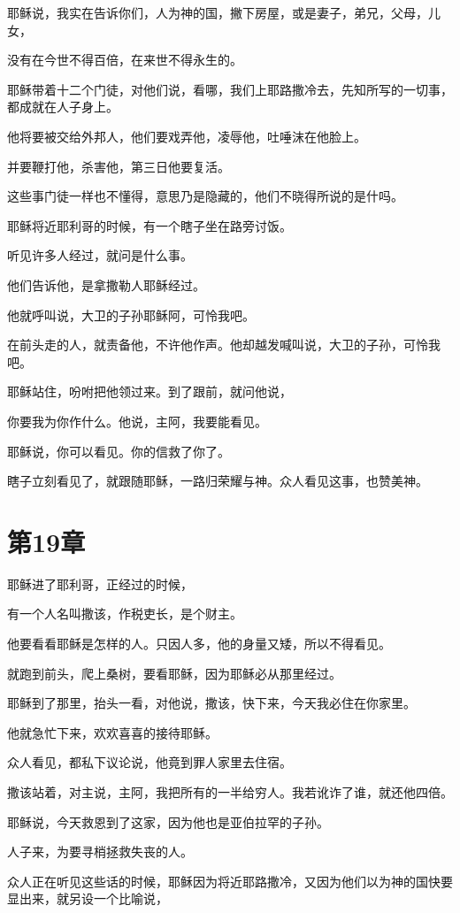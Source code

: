 \documentclass[12pt,oneside]{book}
\begin{document}
耶稣说，我实在告诉你们，人为神的国，撇下房屋，或是妻子，弟兄，父母，儿女，

没有在今世不得百倍，在来世不得永生的。

耶稣带着十二个门徒，对他们说，看哪，我们上耶路撒冷去，先知所写的一切事，都成就在人子身上。

他将要被交给外邦人，他们要戏弄他，凌辱他，吐唾沫在他脸上。

并要鞭打他，杀害他，第三日他要复活。

这些事门徒一样也不懂得，意思乃是隐藏的，他们不晓得所说的是什吗。

耶稣将近耶利哥的时候，有一个瞎子坐在路旁讨饭。

听见许多人经过，就问是什么事。

他们告诉他，是拿撒勒人耶稣经过。

他就呼叫说，大卫的子孙耶稣阿，可怜我吧。

在前头走的人，就责备他，不许他作声。他却越发喊叫说，大卫的子孙，可怜我吧。

耶稣站住，吩咐把他领过来。到了跟前，就问他说，

你要我为你作什么。他说，主阿，我要能看见。

耶稣说，你可以看见。你的信救了你了。

瞎子立刻看见了，就跟随耶稣，一路归荣耀与神。众人看见这事，也赞美神。

\chapter{第19章}
耶稣进了耶利哥，正经过的时候，

有一个人名叫撒该，作税吏长，是个财主。

他要看看耶稣是怎样的人。只因人多，他的身量又矮，所以不得看见。

就跑到前头，爬上桑树，要看耶稣，因为耶稣必从那里经过。

耶稣到了那里，抬头一看，对他说，撒该，快下来，今天我必住在你家里。

他就急忙下来，欢欢喜喜的接待耶稣。

众人看见，都私下议论说，他竟到罪人家里去住宿。

撒该站着，对主说，主阿，我把所有的一半给穷人。我若讹诈了谁，就还他四倍。

耶稣说，今天救恩到了这家，因为他也是亚伯拉罕的子孙。

人子来，为要寻梢拯救失丧的人。

众人正在听见这些话的时候，耶稣因为将近耶路撒冷，又因为他们以为神的国快要显出来，就另设一个比喻说，
\end{document}
